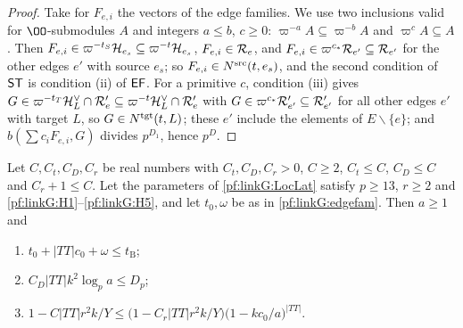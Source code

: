 \begin{proof}
Take for $F_{e,i}$ the vectors of the edge families. We use two inclusions valid for $\OO$-submodules $A$ and integers
$a\le b$, $c\ge0$: $\varpi^{-a}A\subseteq\varpi^{-b}A$ and $\varpi^cA\subseteq A$. Then
$F_{e,i}\in\varpi^{-t_S}\mathcal H_{e_s}\subseteq\varpi^{-t}\mathcal H_{e_s}$, $F_{e,i}\in\mathcal R_e$, and
$F_{e,i}\in\varpi^{c_*}\mathcal R_{e'}\subseteq\mathcal R_{e'}$ for the other edges $e'$ with source $e_s$; so
$F_{e,i}\in N^{\mathrm{src}}(t,e_s)$, and the second condition of $\mathsf{ST}$ is condition (ii) of $\mathsf{EF}$. For a primitive
$c$, condition (iii) gives $G\in\varpi^{-t_T}\mathcal H_L^\vee\cap\mathcal R'_e\subseteq\varpi^{-t}\mathcal H_L^\vee\cap\mathcal R'_e$
with $G\in\varpi^{c_*}\mathcal R'_{e'}\subseteq\mathcal R'_{e'}$ for all other edges $e'$ with target $L$, so $G\in N^{\mathrm{tgt}}(t,L)$;
these $e'$ include the elements of $E\smallsetminus\{e\}$; and $b(\sum c_iF_{e,i},G)$ divides $p^{D_1}$, hence $p^D$.
\end{proof}

\begin{lemma}[Numerics]\label{pf:linkG:num}
Let $C,C_t,C_D,C_r$ be real numbers with $C_t,C_D,C_r>0$, $C\ge2$, $C_t\le C$, $C_D\le C$ and $C_r+1\le C$. Let the
parameters of \cref{pf:linkG:LocLat} satisfy $p\ge13$, $r\ge2$ and \ref{pf:linkG:H1}--\ref{pf:linkG:H5}, and let
$t_0,\omega$ be as in \cref{pf:linkG:edgefam}. Then $a\ge1$ and
\begin{enumerate}[label=(\alph*)]
\item $t_0+|TT|c_0+\omega\le t_{\mathrm B}$;
\item $C_D|TT|k^2\log_pa\le D_p$;
\item $1-C|TT|r^2k/Y\le\bigl(1-C_r|TT|r^2k/Y\bigr)\bigl(1-kc_0/a\bigr)^{|TT|}$.
\end{enumerate}
\end{lemma}


